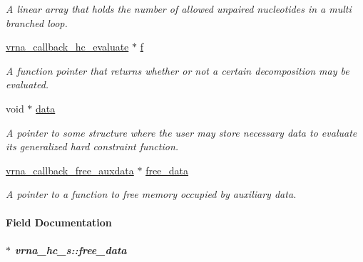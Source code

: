\begin{DoxyCompactItemize}
\begin{DoxyCompactList}\small\item\em A linear array that holds the number of allowed unpaired nucleotides in a multi branched loop. \end{DoxyCompactList}\item 
\hypertarget{group__hard__constraints_a85714afbf27012165ec80c564bd62931}{\hyperlink{group__hard__constraints_gabe10e2b9d2498874bdfe0e0a4dffc246}{vrna\-\_\-callback\-\_\-hc\-\_\-evaluate} $\ast$ \hyperlink{group__hard__constraints_a85714afbf27012165ec80c564bd62931}{f}}\label{group__hard__constraints_a85714afbf27012165ec80c564bd62931}

\begin{DoxyCompactList}\small\item\em A function pointer that returns whether or not a certain decomposition may be evaluated. \end{DoxyCompactList}\item 
\hypertarget{group__hard__constraints_acef3d722142cb5f4a8e114e5fbce3b1a}{void $\ast$ \hyperlink{group__hard__constraints_acef3d722142cb5f4a8e114e5fbce3b1a}{data}}\label{group__hard__constraints_acef3d722142cb5f4a8e114e5fbce3b1a}

\begin{DoxyCompactList}\small\item\em A pointer to some structure where the user may store necessary data to evaluate its generalized hard constraint function. \end{DoxyCompactList}\item 
\hyperlink{group__fold__compound_ga75aaf7b809290de808e545877a9e20f7}{vrna\-\_\-callback\-\_\-free\-\_\-auxdata} $\ast$ \hyperlink{group__hard__constraints_a970e0e202c9e46ebc7640ddc43357ba6}{free\-\_\-data}
\begin{DoxyCompactList}\small\item\em A pointer to a function to free memory occupied by auxiliary data. \end{DoxyCompactList}\end{DoxyCompactItemize}


\paragraph{Field Documentation}
\hypertarget{group__hard__constraints_a970e0e202c9e46ebc7640ddc43357ba6}{
\subparagraph[{free\-\_\-data}]{$\ast$ vrna\-\_\-hc\-\_\-s\-::free\-\_\-data}}\label{group__hard__constraints_a970e0e202c9e46ebc7640ddc43357ba6}


